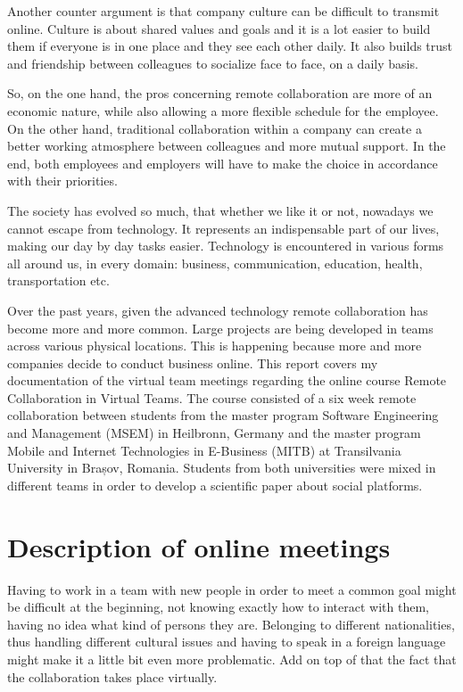 \par
Another counter argument is that company culture can be difficult to transmit online. Culture is about shared values and goals and it is a lot easier to build them if everyone is in one place and they see each other daily. It also builds trust and friendship between colleagues to socialize face to face, on a daily basis. 
\par
So, on the one hand, the pros concerning remote collaboration are more of an economic nature, while also allowing a more flexible schedule for the employee. On the other hand, traditional collaboration within a company can create a better working atmosphere between colleagues and more mutual support. In the end, both employees and employers will have to make the choice in accordance with their priorities.  
\par
The society has evolved so much, that whether we like it or not, nowadays we cannot escape from technology. It represents an indispensable part of our lives, making our day by day tasks easier. Technology is encountered in various forms all around us, in every domain: business, communication, education, health, transportation etc. 
\par
Over the past years, given the advanced technology remote collaboration has become more and more common. Large projects are being developed in teams across various physical locations. This is happening because more and more companies decide to conduct business online. 
This report covers my documentation of the virtual team meetings regarding the online course Remote Collaboration in Virtual Teams. The course consisted of a six week remote collaboration between students from the master program Software Engineering and Management (MSEM) in Heilbronn, Germany and the master program Mobile and Internet Technologies in E-Business (MITB) at Transilvania University in Brașov, Romania. Students from both universities were mixed in different teams in order to develop a scientific paper about social platforms.

\section{Description of online meetings}
Having to work in a team with new people in order to meet a common goal might be difficult at the beginning, not knowing exactly how to interact with them, having no idea what kind of persons they are. Belonging to different nationalities, thus handling different cultural issues and having to speak in a foreign language might make it a little bit even more problematic. Add on top of that the fact that the collaboration takes place virtually.


